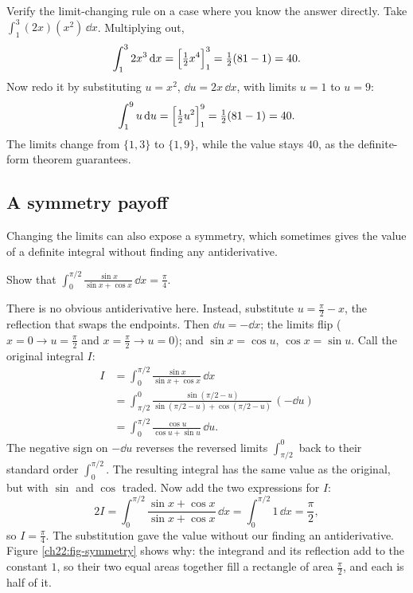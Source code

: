 \begin{labbox}
Verify the limit-changing rule on a case where you know the
answer directly. Take $\int_1^3 (2x)(x^2)\,\dd x$. Multiplying out,
\[
  \int_1^3 2x^3\,\mathrm{d} x = \Big[\tfrac12 x^4\Big]_{1}^{3} = \tfrac12(81-1) = 40.
\]
Now redo it by substituting $u = x^2$, $\dd u = 2x\,\dd x$, with limits $u=1$ to
$u=9$:
\[
  \int_1^9 u\,\mathrm{d} u = \Big[\tfrac12 u^2\Big]_{1}^{9} = \tfrac12(81-1) = 40.
\]
The limits change from $\{1,3\}$ to $\{1,9\}$, while the value stays $40$, as the
definite-form theorem guarantees.
\end{labbox}

\subsection{A symmetry payoff}

Changing the limits can also expose a symmetry, which sometimes gives the value of a
definite integral without finding any antiderivative.

\begin{example}
\label{ch22:ex-symmetry}
Show that $\displaystyle \int_0^{\pi/2} \frac{\sin x}{\sin x + \cos x}\,\dd x =
\frac{\pi}{4}$.

There is no obvious antiderivative here. Instead, substitute $u = \tfrac{\pi}{2} -
x$, the reflection that swaps the endpoints. Then $\dd u = -\dd x$; the limits flip
($x=0\!\to\!u=\tfrac\pi2$ and $x=\tfrac\pi2\!\to\!u=0$); and $\sin x = \cos u$,
$\cos x = \sin u$. Call the original integral $I$:
\begin{align*}
  I &= \int_0^{\pi/2}\frac{\sin x}{\sin x+\cos x}\,\dd x\\
    &= \int_{\pi/2}^0 \frac{\sin(\pi/2-u)}{\sin(\pi/2-u)+\cos(\pi/2-u)}\,(-\dd u)\\
    &= \int_0^{\pi/2}\frac{\cos u}{\cos u + \sin u}\,\dd u.
\end{align*}
The negative sign on $-\dd u$ reverses the reversed limits $\int_{\pi/2}^0$ back to
their standard order $\int_0^{\pi/2}$. The resulting integral has the same value
as the original, but with $\sin$ and $\cos$ traded. Now add the two expressions for $I$:
\[
  2I = \int_0^{\pi/2}\frac{\sin x + \cos x}{\sin x + \cos x}\,\dd x
     = \int_0^{\pi/2} 1\,\dd x = \frac{\pi}{2},
\]
so $I = \tfrac{\pi}{4}$. The substitution gave the value without our finding an
antiderivative. Figure
\ref{ch22:fig-symmetry} shows why: the integrand and its reflection add to the
constant $1$, so their two equal areas together fill a rectangle of area
$\tfrac\pi2$, and each is half of it.
\end{example}

